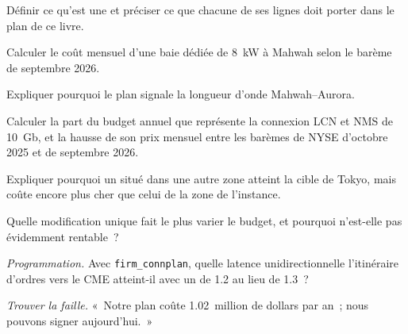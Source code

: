 \begin{exercise}[$\star$]\label{exo:nw:build-a-connectivity-plan:1}
Définir ce qu'est une  et préciser ce que chacune de ses lignes doit porter dans le plan de ce livre.
\end{exercise}

\begin{exercise}[$\star$]\label{exo:nw:build-a-connectivity-plan:2}
Calculer le coût mensuel d'une baie dédiée de 8~kW à Mahwah selon le barème de septembre 2026.
\end{exercise}

\begin{exercise}[$\star$]\label{exo:nw:build-a-connectivity-plan:3}
Expliquer pourquoi le plan signale la longueur d'onde Mahwah--Aurora.
\end{exercise}

\begin{exercise}[$\star\star$]\label{exo:nw:build-a-connectivity-plan:4}
Calculer la part du budget annuel que représente la connexion LCN et NMS de 10~Gb, et la hausse de son prix mensuel entre les barèmes
de NYSE d'octobre 2025 et de septembre 2026.
\end{exercise}

\begin{exercise}[$\star\star$]\label{exo:nw:build-a-connectivity-plan:5}
Expliquer pourquoi un  situé dans une autre zone atteint la cible de Tokyo, mais coûte encore plus cher que celui de la zone de l'instance.
\end{exercise}

\begin{exercise}[$\star\star$]\label{exo:nw:build-a-connectivity-plan:6}
Quelle modification unique fait le plus varier le budget, et pourquoi n'est-elle pas évidemment rentable~?
\end{exercise}

\begin{exercise}[$\star\star\star$]\label{exo:nw:build-a-connectivity-plan:7}
\emph{Programmation.} Avec \texttt{firm\_connplan}, quelle latence unidirectionnelle l'itinéraire d'ordres vers le CME atteint-il avec un  de 1.2 au lieu de 1.3~?
\end{exercise}

\begin{exercise}[$\star\star\star$]\label{exo:nw:build-a-connectivity-plan:8}
\emph{Trouver la faille.} «~Notre plan coûte 1.02~million de dollars par an~; nous pouvons signer aujourd'hui.~»
\end{exercise}

